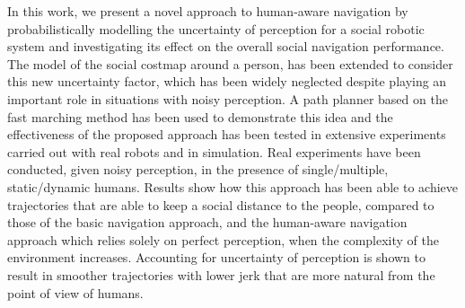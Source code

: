 In this work, we present a novel approach to human-aware navigation by probabilistically modelling the uncertainty of perception for a social robotic system and investigating its effect on the overall social navigation performance. The %
model of the social costmap around a person, has been extended to consider this new uncertainty factor, which has been widely neglected despite playing an important role in situations with noisy perception. A path planner based on the fast marching method has been used to demonstrate this idea and the effectiveness of the proposed approach has been tested in extensive experiments carried out with real robots and in simulation. Real experiments have been conducted, given noisy perception, in the presence of single/multiple, static/dynamic humans. Results show how this approach has been able to achieve trajectories that are able to keep a social distance to the people, compared to those of the basic navigation approach, and the human-aware navigation approach which relies solely on perfect perception, when the complexity of the environment increases. 
Accounting for uncertainty of perception is shown to result in smoother trajectories with lower jerk that are more natural from the point of view of humans. 



